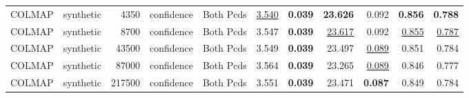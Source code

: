 \begin{table}[H]
\begin{tabular}{llrllrrrrrr}
COLMAP & synthetic & 4350 & confidence & Both Pcds & \underline{3.540} & \textbf{0.039} & \textbf{23.626} & 0.092 & \textbf{0.856} & \textbf{0.788} \\
COLMAP & synthetic & 8700 & confidence & Both Pcds & 3.547 & \textbf{0.039} & \underline{23.617} & 0.092 & \underline{0.855} & \underline{0.787} \\
COLMAP & synthetic & 43500 & confidence & Both Pcds & 3.549 & \textbf{0.039} & 23.497 & \underline{0.089} & 0.851 & 0.784 \\
COLMAP & synthetic & 87000 & confidence & Both Pcds & 3.564 & \textbf{0.039} & 23.265 & \underline{0.089} & 0.846 & 0.777 \\
COLMAP & synthetic & 217500 & confidence & Both Pcds & 3.551 & \textbf{0.039} & 23.471 & \textbf{0.087} & 0.849 & 0.784 \\
\bottomrule
\end{tabular}
\end{table}
